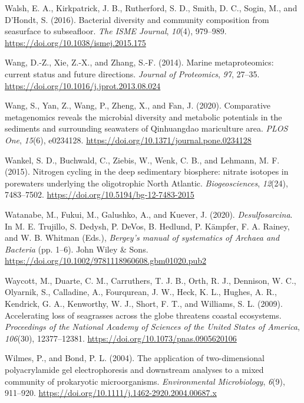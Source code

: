\documentclass[
  12 pt,
]{book}
\newlength{\cslhangindent}
\newlength{\cslentryspacingunit} %
\newenvironment{CSLReferences}[2] %
 {%
  \setlength{\parindent}{0pt}
  \ifodd #1
  \let\oldpar\par
  \def\par{\hangindent=\cslhangindent\oldpar}
  \fi
  \setlength{\parskip}{#2\cslentryspacingunit}
 }%
 {}
\begin{document}
\begin{CSLReferences}{1}{0}
\leavevmode{}%
Walsh, E. A., Kirkpatrick, J. B., Rutherford, S. D., Smith, D. C., Sogin, M., and D'Hondt, S. (2016). Bacterial diversity and community composition from seasurface to subseafloor. \emph{The ISME Journal}, \emph{10}(4), 979--989. \url{https://doi.org/10.1038/ismej.2015.175}

\leavevmode{}%
Wang, D.-Z., Xie, Z.-X., and Zhang, S.-F. (2014). Marine metaproteomics: current status and future directions. \emph{Journal of Proteomics}, \emph{97}, 27--35. \url{https://doi.org/10.1016/j.jprot.2013.08.024}

\leavevmode{}%
Wang, S., Yan, Z., Wang, P., Zheng, X., and Fan, J. (2020). Comparative metagenomics reveals the microbial diversity and metabolic potentials in the sediments and surrounding seawaters of {Qinhuangdao} mariculture area. \emph{PLOS One}, \emph{15}(6), e0234128. \url{https://doi.org/10.1371/journal.pone.0234128}

\leavevmode{}%
Wankel, S. D., Buchwald, C., Ziebis, W., Wenk, C. B., and Lehmann, M. F. (2015). Nitrogen cycling in the deep sedimentary biosphere: nitrate isotopes in porewaters underlying the oligotrophic {North Atlantic}. \emph{Biogeosciences}, \emph{12}(24), 7483--7502. \url{https://doi.org/10.5194/bg-12-7483-2015}

\leavevmode{}%
Watanabe, M., Fukui, M., Galushko, A., and Kuever, J. (2020). {\emph{Desulfosarcina}}. In M. E. Trujillo, S. Dedysh, P. DeVos, B. Hedlund, P. Kämpfer, F. A. Rainey, and W. B. Whitman (Eds.), \emph{Bergey's manual of systematics of {{\emph{Archaea}}} and {{\emph{Bacteria}}}} (pp. 1--6). John Wiley \& Sons. \url{https://doi.org/10.1002/9781118960608.gbm01020.pub2}

\leavevmode{}%
Waycott, M., Duarte, C. M., Carruthers, T. J. B., Orth, R. J., Dennison, W. C., Olyarnik, S., Calladine, A., Fourqurean, J. W., Heck, K. L., Hughes, A. R., Kendrick, G. A., Kenworthy, W. J., Short, F. T., and Williams, S. L. (2009). Accelerating loss of seagrasses across the globe threatens coastal ecosystems. \emph{Proceedings of the National Academy of Sciences of the United States of America}, \emph{106}(30), 12377--12381. \url{https://doi.org/10.1073/pnas.0905620106}

\leavevmode{}%
Wilmes, P., and Bond, P. L. (2004). The application of two-dimensional polyacrylamide gel electrophoresis and downstream analyses to a mixed community of prokaryotic microorganisms. \emph{Environmental Microbiology}, \emph{6}(9), 911--920. \url{https://doi.org/10.1111/j.1462-2920.2004.00687.x}


\end{CSLReferences}
\end{document}
